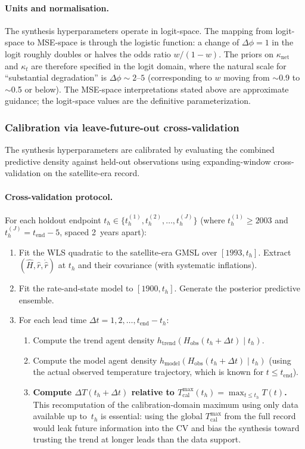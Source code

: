 \documentclass[11pt]{article}
\newcommand{\dT}{\Delta T}
\newcommand{\tcal}{T_{\mathrm{cal}}^{\max}}
\newcommand{\tend}{t_{\mathrm{end}}}
\begin{document}
\paragraph{Units and normalisation.}
\label{sec:kappa_net_units}
The synthesis hyperparameters operate in logit-space.  The mapping from logit-space to MSE-space is through the logistic function: a change of $\Delta\phi = 1$ in the logit roughly doubles or halves the odds ratio $w / (1 - w)$.  The priors on $\kappa_{\mathrm{net}}$ and $\kappa_t$ are therefore specified in the logit domain, where the natural scale for ``substantial degradation'' is $\Delta\phi \sim 2\text{--}5$ (corresponding to $w$ moving from $\sim$0.9 to $\sim$0.5 or below).  The MSE-space interpretations stated above are approximate guidance; the logit-space values are the definitive parameterization.


\subsubsection{Calibration via leave-future-out cross-validation}
\label{sec:lfocv}

The synthesis hyperparameters are calibrated by evaluating the combined predictive density against held-out observations using expanding-window cross-validation on the satellite-era record.

\paragraph{Cross-validation protocol.}  For each holdout endpoint $t_h \in \{t_h^{(1)}, t_h^{(2)}, \ldots, t_h^{(J)}\}$ (where $t_h^{(1)} \ge 2003$ and $t_h^{(J)} = \tend - 5$, spaced 2~years apart):
\begin{enumerate}
  \item Fit the WLS quadratic to the satellite-era GMSL over $[1993, t_h]$.  Extract $(\hat{H}, \hat{r}, \dot{\hat{r}})$ at $t_h$ and their covariance (with systematic inflations).
  \item Fit the rate-and-state model to $[1900, t_h]$.  Generate the posterior predictive ensemble.
  \item For each lead time $\Delta t = 1, 2, \ldots, \tend - t_h$:
  \begin{enumerate}
    \item Compute the trend agent density $h_{\mathrm{trend}}(H_{\mathrm{obs}}(t_h + \Delta t) \mid t_h)$.
    \item Compute the model agent density $h_{\mathrm{model}}(H_{\mathrm{obs}}(t_h + \Delta t) \mid t_h)$ (using the actual observed temperature trajectory, which is known for $t \le \tend$).
    \item \textbf{Compute $\dT(t_h + \Delta t)$ relative to $\tcal(t_h) = \max_{t \le t_h} T(t)$.}  This recomputation of the calibration-domain maximum using only data available up to~$t_h$ is essential: using the global $\tcal$ from the full record would leak future information into the CV and bias the synthesis toward trusting the trend at longer leads than the data support.
  \end{enumerate}
\end{enumerate}
\end{document}
